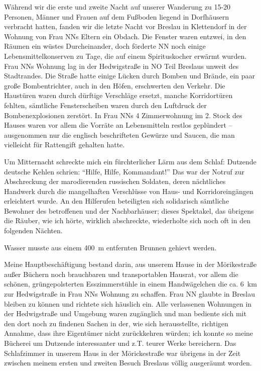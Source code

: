 \documentclass[a5paper,pagesize,10pt,twoside=true]{scrbook}
\renewcommand{\marginpar}[2][]{}
\begin{document}
Während wir die erste und zweite Nacht auf unserer Wanderung zu 15-20 Personen, Männer und Frauen auf dem Fußboden liegend in Dorfhäusern verbracht hatten, fanden wir die letzte Nacht vor Breslau in Klettendorf in der Wohnung von Frau NNs Eltern ein Obdach. Die Fenster waren entzwei, in den Räumen ein wüstes Durcheinander, doch förderte NN noch einige Lebensmittelkonserven zu Tage, die auf einem Spirituskocher erwärmt wurden. Frau NNs Wohnung lag in der Hedwigstraße in NO Teil Breslaus unweit des Stadtrandes. Die Straße hatte einige Lücken durch Bomben und Brände, ein paar große Bombentrichter, auch in den Höfen, erschwerten den Verkehr. Die Haustüren waren durch dürftige Verschläge \marginpar{94} ersetzt, manche Korridortüren fehlten, sämtliche Fensterscheiben waren durch den Luftdruck der Bombenexplosionen zerstört. In Frau NNs 4 Zimmerwohnung im 2. Stock des Hauses waren vor allem die Vorräte an Lebensmitteln restlos geplündert -- ausgenommen nur die englisch beschrifteten Gewürze und Saucen, die man vielleicht für Rattengift gehalten hatte.

Um Mitternacht schreckte mich ein fürchterlicher Lärm aus dem Schlaf: Dutzende deutsche Kehlen schrien: \enquote{Hilfe, Hilfe, Kommandant!} Das war der Notruf zur Abschreckung der marodierenden russischen Soldaten, deren nächtliches Handwerk durch die mangelhaften Verschlüsse von Haus- und Korridoreingängen erleichtert wurde. An den Hilferufen beteiligten sich solidarisch sämtliche Bewohner des betroffenen und der Nachbarhäuser; dieses Spektakel, das übrigens die Räuber, wie ich hörte, wirklich abschreckte, wiederholte sich noch oft in den folgenden Nächten.

Wasser musste aus einem 400~m entfernten Brunnen gehievt werden.

\marginpar{17.2.1977 B. Lauterberg} Meine Hauptbeschäftigung bestand darin, aus unserem Hause in der Mörikestraße außer Büchern noch brauchbaren und transportablen Hausrat, vor allem die schönen, grüngepolsterten Esszimmerstühle in einem \marginpar{95} Handwägelchen die ca. 6~km zur Hedwigstraße in Frau NNs Wohnung zu schaffen. Frau NN glaubte in Breslau bleiben zu können und richtete sich häuslich ein. Alle verlassenen Wohnungen in der Hedwigstraße und Umgebung waren zugänglich und man bediente sich mit den dort noch zu findenen Sachen in der, wie sich herausstellte, richtigen Annahme, dass ihre Eigentümer nicht zurückkehren würden; ich konnte so meine Bücherei um Dutzende interessanter und z.T. teurer Werke bereichern. Das Schlafzimmer in unserem Haus in der Mörickestraße war übrigens in der Zeit zwischen meinem ersten und zweiten Besuch Breslaus völlig ausgeräumt worden.
\end{document}
